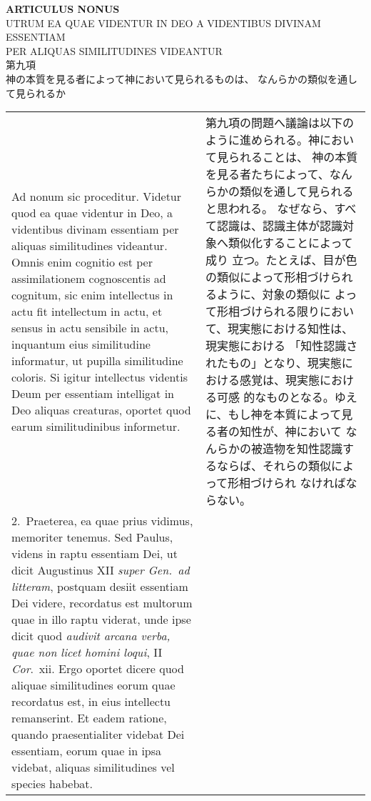 \documentclass[10pt]{jsarticle} %
\begin{document}
\begin{center}
 {\Large {\bf ARTICULUS NONUS}}\\{\large UTRUM EA QUAE VIDENTUR IN
DEO A VIDENTIBUS DIVINAM ESSENTIAM\\PER ALIQUAS SIMILITUDINES
VIDEANTUR\\第九項\\神の本質を見る者によって神において見られるものは、
なんらかの類似を通して見られるか}

\end{center} 

\begin{longtable}{p{21em}p{21em}}

{\sc Ad nonum sic proceditur}. Videtur quod ea quae videntur in Deo, a
videntibus divinam essentiam per aliquas similitudines
videantur. Omnis enim cognitio est per assimilationem cognoscentis ad
cognitum, sic enim intellectus in actu fit intellectum in actu, et
sensus in actu sensibile in actu, inquantum eius similitudine
informatur, ut pupilla similitudine coloris. Si igitur intellectus
videntis Deum per essentiam intelligat in Deo aliquas creaturas,
oportet quod earum similitudinibus informetur.

&

第九項の問題へ議論は以下のように進められる。神において見られることは、
神の本質を見る者たちによって、なんらかの類似を通して見られると思われる。
なぜなら、すべて認識は、認識主体が認識対象へ類似化することによって成り
立つ。たとえば、目が色の類似によって形相づけられるように、対象の類似に
よって形相づけられる限りにおいて、現実態における知性は、現実態における
「知性認識されたもの」となり、現実態における感覚は、現実態における可感
的なものとなる。ゆえに、もし神を本質によって見る者の知性が、神において
なんらかの被造物を知性認識するならば、それらの類似によって形相づけられ
なければならない。

\\

2.~{\sc Praeterea}, ea quae prius vidimus, memoriter tenemus. Sed
 Paulus, videns in raptu essentiam Dei, ut dicit Augustinus XII {\it
 super Gen.\ ad litteram}, postquam desiit essentiam Dei videre,
 recordatus est multorum quae in illo raptu viderat, unde ipse dicit
 quod {\it audivit arcana verba, quae non licet homini loqui}, II {\it
 Cor}.\ {\sc xii}. Ergo oportet dicere quod aliquae similitudines
 eorum quae recordatus est, in eius intellectu remanserint. Et eadem
 ratione, quando praesentialiter videbat Dei essentiam, eorum quae in
 ipsa videbat, aliquas similitudines vel species habebat.


\end{longtable}
\end{document}
